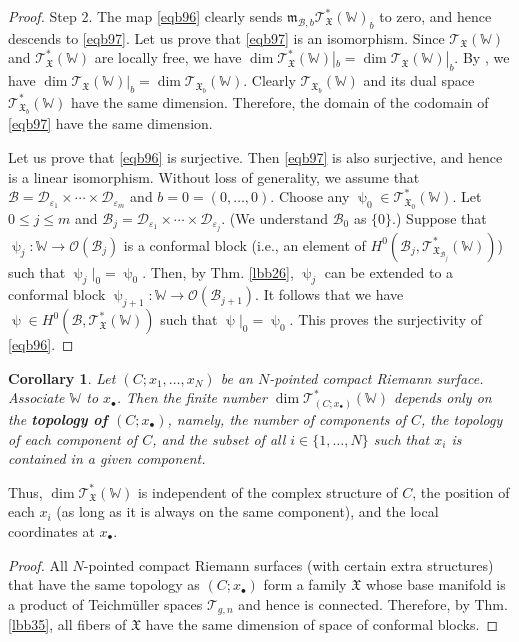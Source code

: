 \documentclass[11pt,b5paper,notitlepage]{article}
\theoremstyle{definition}
\theoremstyle{plain}
\newtheorem{co}[df]{Corollary}
\newcommand{\scr}{\mathscr}
\newcommand{\blt}{\bullet}
\newcommand{\Wbb}{\mathbb W}
\newcommand{\<}{\left\langle}
\renewcommand{\>}{\right\rangle}
\newcommand{\MO}{\mathcal{O}}
\newcommand{\MB}{\mathcal{B}}
\newcommand{\fx}{\mathfrak{X}}
\newcommand{\ST}{\mathscr{T}}
\newcommand{\MD}{\mathcal{D}}
\newcommand{\mk}{\mathfrak m}
\newcommand{\eps}{\varepsilon}
\numberwithin{equation}{section}
\begin{document}
\begin{proof}
Step 2. The map \eqref{eqb96} clearly sends $\mk_{\MB,b}\ST^*_\fx(\Wbb)_b$ to zero, and hence descends to \eqref{eqb97}.  Let us prove that \eqref{eqb97} is an isomorphism. Since $\ST_\fx(\Wbb)$ and $\ST^*_\fx(\Wbb)$ are locally free, we have $\dim\ST_\fx^*(\Wbb)|_b=\dim\ST_\fx(\Wbb)|_b$. By \cite[Prop. 2.19]{GZ1}, we have $\dim\ST_\fx(\Wbb)|_b=\dim\ST_{\fx_b}(\Wbb)$. Clearly $\ST_{\fx_b}(\Wbb)$ and its dual space $\ST^*_{\fx_b}(\Wbb)$ have the same dimension. Therefore, the domain of the codomain of \eqref{eqb97} have the same dimension.

Let us prove that \eqref{eqb96} is surjective. Then \eqref{eqb97} is also surjective, and hence is a linear isomorphism. Without loss of generality, we assume that $\MB=\MD_{\eps_1}\times\cdots\times\MD_{\eps_m}$ and $b=0=(0,\dots,0)$. Choose any $\uppsi_0\in\ST^*_{\fx_0}(\Wbb)$. Let $0\leq j\leq m$ and $\MB_j=\MD_{\eps_1}\times\cdots\times\MD_{\eps_j}$. (We understand $\MB_0$ as $\{0\}$.) Suppose that $\uppsi_j:\Wbb\rightarrow\MO(\MB_j)$ is a conformal block (i.e., an element of $H^0(\MB_j,\ST^*_{\fx_{\MB_j}}(\Wbb))$) such that $\uppsi_j|_0=\uppsi_0$. Then, by Thm. \ref{lbb26}, $\uppsi_j$ can be extended to a conformal block $\uppsi_{j+1}:\Wbb\rightarrow\MO(\MB_{j+1})$. It follows that we have $\uppsi\in H^0(\MB,\ST_\fx^*(\Wbb))$ such that $\uppsi|_0=\uppsi_0$. This proves the surjectivity of \eqref{eqb96}.
\end{proof}



\begin{co}
Let $(C;x_1,\dots,x_N)$ be an $N$-pointed compact Riemann surface. Associate $\Wbb$ to $x_\blt$. Then the finite number $\dim\scr T_{(C;x_\blt)}^*(\Wbb)$ depends only on the \textbf{topology of $(C;x_\blt)$}, namely,  the number of components of $C$, the topology of each component of $C$, and the subset of all $i\in\{1,\dots,N\}$ such that $x_i$ is contained in a given component.
\end{co}

Thus, $\dim\scr T_\fx^*(\Wbb)$ is independent of the complex structure of $C$, the position of each $x_i$ (as long as it is always on the same component), and the local coordinates at $x_\blt$.

\begin{proof}
All $N$-pointed compact Riemann surfaces (with certain extra structures) that have the same topology as $(C;x_\blt)$ form a family $\fx$ whose base manifold is a product of Teichm\"uller spaces $\mathcal T_{g,n}$ and hence is connected. Therefore, by Thm. \ref{lbb35}, all fibers of $\fx$ have the same dimension of space of conformal blocks.
\end{proof}
\end{document}
